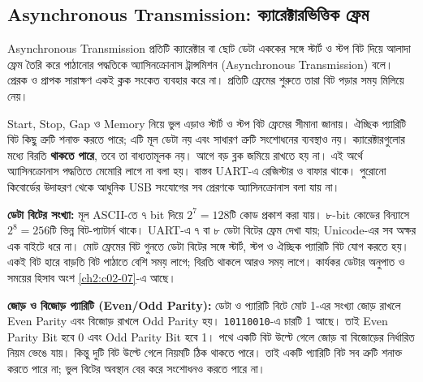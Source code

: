 \subsection{Asynchronous Transmission: ক্যারেক্টারভিত্তিক ফ্রেম}
\label{ch2:c02-04}
\begin{definitionbox}{Asynchronous Transmission}
প্রতিটি ক্যারেক্টার বা ছোট ডেটা এককের সঙ্গে স্টার্ট ও স্টপ বিট দিয়ে আলাদা ফ্রেম তৈরি করে পাঠানোর পদ্ধতিকে অ্যাসিনক্রোনাস ট্রান্সমিশন (Asynchronous Transmission) বলে। প্রেরক ও প্রাপক সারাক্ষণ একই ক্লক সংকেত ব্যবহার করে না। প্রতিটি ফ্রেমের শুরুতে তারা বিট পড়ার সময় মিলিয়ে নেয়।
\end{definitionbox}
\begin{mistakebox}{Start, Stop, Gap ও Memory নিয়ে ভুল এড়াও}
স্টার্ট ও স্টপ বিট ফ্রেমের সীমানা জানায়। ঐচ্ছিক প্যারিটি বিট কিছু ত্রুটি শনাক্ত করতে পারে; এটি মূল ডেটা নয় এবং সাধারণ ত্রুটি সংশোধনের ব্যবস্থাও নয়। ক্যারেক্টারগুলোর মধ্যে বিরতি \textbf{থাকতে পারে}, তবে তা বাধ্যতামূলক নয়। আগে বড় ব্লক জমিয়ে রাখতে হয় না। এই অর্থে অ্যাসিনক্রোনাস পদ্ধতিতে মেমোরি লাগে না বলা হয়। বাস্তব UART-এ রেজিস্টার ও বাফার থাকে। পুরোনো কিবোর্ডের উদাহরণ থেকে আধুনিক USB সংযোগের সব প্রেরণকে অ্যাসিনক্রোনাস বলা যায় না।
\end{mistakebox}
\textbf{ডেটা বিটের সংখ্যা:} মূল ASCII-তে ৭ bit দিয়ে $2^7=128$টি কোড প্রকাশ করা যায়। ৮-bit কোডের বিন্যাসে $2^8=256$টি ভিন্ন বিট-প্যাটার্ন থাকে। UART-এ ৭ বা ৮ ডেটা বিটের ফ্রেম দেখা যায়; Unicode-এর সব অক্ষর এক বাইটে ধরে না। মোট ফ্রেমের বিট গুনতে ডেটা বিটের সঙ্গে স্টার্ট, স্টপ ও ঐচ্ছিক প্যারিটি বিট যোগ করতে হয়। একই বিট হারে বাড়তি বিট পাঠাতে বেশি সময় লাগে; বিরতি থাকলে আরও সময় লাগে। কার্যকর ডেটার অনুপাত ও সময়ের হিসাব অংশ \ref{ch2:c02-07}-এ আছে।

\textbf{জোড় ও বিজোড় প্যারিটি (Even/Odd Parity):} ডেটা ও প্যারিটি বিটে মোট 1-এর সংখ্যা জোড় রাখলে Even Parity এবং বিজোড় রাখলে Odd Parity হয়। \texttt{10110010}-এ চারটি 1 আছে। তাই Even Parity Bit হবে 0 এবং Odd Parity Bit হবে 1। পথে একটি বিট উল্টে গেলে জোড় বা বিজোড়ের নির্ধারিত নিয়ম ভেঙে যায়। কিন্তু দুটি বিট উল্টে গেলে নিয়মটি ঠিক থাকতে পারে। তাই একটি প্যারিটি বিট সব ত্রুটি শনাক্ত করতে পারে না; ভুল বিটের অবস্থান বের করে সংশোধনও করতে পারে না।

